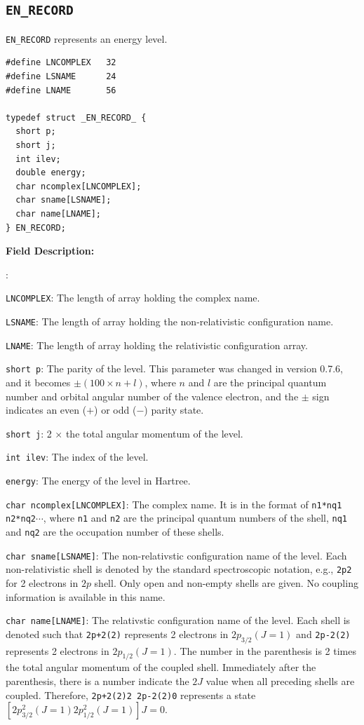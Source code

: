 \documentclass[twoside,letterpaper]{refrep}
\newenvironment{dbdesc}{\textbf{Field Description:} \begin{list}
	{:}{\setlength{\labelwidth}{2in}
	   \setlength{\leftmargin}{2in}
	   \setlength{\labelsep}{0.1in}
	   \setlength{\rightmargin}{0.2in}}}
	{\end{list}}
\begin{document}
\subsection{\texttt{EN\_RECORD}}
\texttt{EN\_RECORD} represents an energy level.

\begin{verbatim}
#define LNCOMPLEX   32
#define LSNAME      24
#define LNAME       56

typedef struct _EN_RECORD_ {
  short p;
  short j;
  int ilev;
  double energy;
  char ncomplex[LNCOMPLEX];
  char sname[LSNAME];
  char name[LNAME];
} EN_RECORD;
\end{verbatim}

\begin{dbdesc}
\item[\texttt{LNCOMPLEX}:] The length of array holding the complex name.
\item[\texttt{LSNAME}:] The length of array holding the non-relativistic
configuration name.
\item[\texttt{LNAME}:] The length of array holding the relativistic
configuration array.
\item[\texttt{short p}:] The parity of the level. This parameter was changed
in version 0.7.6, and it becomes $\pm(100\times n + l)$, where $n$ and $l$ are
the principal quantum number and orbital angular number of the valence
electron, and the $\pm$ sign indicates an even ($+$) or odd ($-$) parity state.
\item[\texttt{short j}:] 2 $\times$ the total angular momentum of the level.
\item[\texttt{int ilev}:] The index of the level.
\item[\texttt{energy}:] The energy of the level in Hartree.
\item[\texttt{char ncomplex[LNCOMPLEX]}:] The complex name. It is in the format
of \verb|n1*nq1 n2*nq2|$\cdots$, where \verb|n1| and \verb|n2| are the
principal quantum numbers of the shell, \verb|nq1| and \verb|nq2| are the
occupation number of these shells.
\item[\texttt{char sname[LSNAME]}:] The non-relativstic configuration name of
the level. Each non-relativistic shell is denoted by the standard
spectroscopic notation, e.g., \verb|2p2| for 2 electrons in $2p$ shell. Only
open and non-empty shells are given. No coupling information is available in
this name.
\item[\texttt{char name[LNAME]}:] The relativstic configuration name of the
level. Each shell is denoted such that \verb|2p+2(2)| represents 2 electrons in
$2p_{3/2}(J=1)$ and \verb|2p-2(2)| represents 2 electrons in
$2p_{1/2}(J=1)$. The number in the parenthesis is 2 times the total angular
momentum of the coupled shell. Immediately after the parenthesis, there is a
number indicate the $2J$ value when all preceding shells are
coupled. Therefore, \verb|2p+2(2)2 2p-2(2)0| represents a state
$[2p_{3/2}^{2}(J=1) 2p_{1/2}^2(J=1)]J=0$.
\end{dbdesc}
\end{document}
